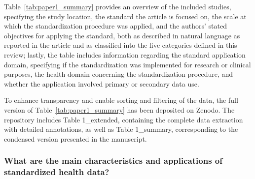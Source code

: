 Table~\ref{tab:paper1_summary} provides an overview of the included studies, specifying the study location, the standard the article is focused on, the scale at which the standardization procedure was applied, and the authors' stated objectives for applying the standard, both as described in natural language as reported in the article and as classified into the five categories defined in this review; lastly, the table includes information regarding the standard application domain, specifying if the standardization was implemented for research or clinical purposes, the health domain concerning the standardization procedure, and whether the application involved primary or secondary data use.

To enhance transparency and enable sorting and filtering of the data, the full version of Table~\ref{tab:paper1_summary} has been deposited on Zenodo. The repository \cite{marfoglia_challenges_data_2026} includes Table 1\_extended, containing the complete data extraction with detailed annotations, as well as Table 1\_summary, corresponding to the condensed version presented in the manuscript.

\subsubsection{What are the main characteristics and applications of standardized health data?}
\label{sec:paper1_results_characteristics}

